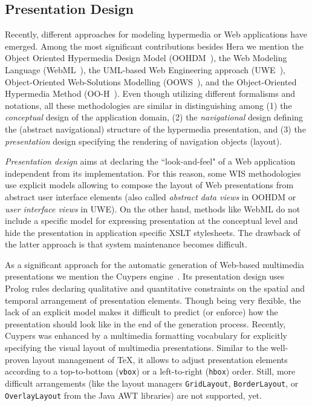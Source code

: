 \documentclass[oribibl]{llncs}
\begin{document}
\subsection{Presentation Design}
Recently, different approaches for modeling hypermedia or Web applications have emerged.
Among the most significant contributions besides Hera we mention the Object Oriented Hypermedia Design Model (OOHDM~\cite{oohdm}), the Web Modeling Language (WebML~\cite{ceri:webml}), the UML-based Web Engineering approach (UWE~\cite{uwe}), Object-Oriented Web-Solutions Modelling (OOWS~\cite{oows2003}), and the Object-Oriented Hypermedia Method (OO-H~\cite{oo-h2003}).
Even though utilizing different formalisms and notations, all these methodologies are similar in distinguishing among (1) the \emph{conceptual} design of the application domain, (2) the \emph{navigational} design defining the (abstract navigational) structure of the hypermedia presentation, and (3) the \emph{presentation} design specifying the rendering of navigation objects (layout).

\emph{Presentation design} aims at declaring the ``look-and-feel" of a Web application independent from its implementation. 
For this reason, some WIS methodologies use explicit models allowing to compose the layout of Web presentations from abstract user interface elements (also called \emph{abstract data views} in OOHDM or \emph{user interface views} in UWE).
On the other hand, methods like WebML do not include a specific model for expressing presentation at the conceptual level and hide the presentation in application specific XSLT stylesheets.
The drawback of the latter approach is that system maintenance becomes difficult.

As a significant approach for the automatic generation of Web-based multimedia presentations we mention the Cuypers engine~\cite{cuypers2001}. 
Its presentation design uses Prolog rules declaring qualitative and quantitative constraints on the spatial and temporal arrangement of presentation elements.
Though being very flexible, the lack of an explicit model makes it difficult to predict (or enforce) how the presentation should look like in the end of the generation process.
Recently, Cuypers was enhanced by a multimedia formatting vocabulary for explicitly specifying the visual layout of multimedia presentations.
Similar to the well-proven layout management of \TeX, it allows to adjust presentation elements according to a top-to-bottom (\texttt{vbox}) or a left-to-right (\texttt{hbox}) order.
Still, more difficult arrangements (like the layout managers \texttt{GridLayout}, \texttt{BorderLayout}, or \texttt{OverlayLayout} from the Java AWT libraries) are not supported, yet.
\end{document}

